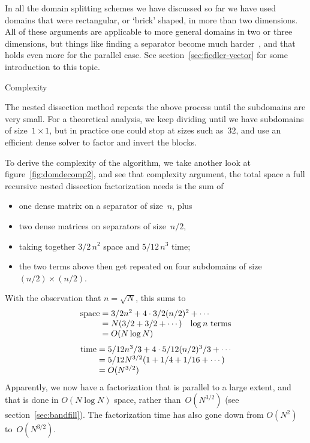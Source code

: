In all the domain splitting schemes we have discussed so far we have
used domains that were rectangular, or `brick' shaped, in more than
two dimensions. All of these arguments are applicable to more general
domains in two or three dimensions, but things like finding a
separator become much harder~\cite{LiRoTa:dissection}, and that holds
even more for the parallel case. See section~\ref{sec:fiedler-vector}
for some introduction to this topic.

 {Complexity}

The nested dissection method repeats the above process until the
subdomains are very small.  For a theoretical analysis, we keep
dividing until we have subdomains of size~$1\times1$, but in practice
one could stop at sizes such as~$32$, and use an efficient dense
solver to factor and invert the blocks.

To derive the complexity of the algorithm, we take another look at
figure~\ref{fig:domdecomp2}, and see that
complexity argument, the total space a full recursive nested
dissection factorization needs is the sum of
\begin{itemize}
\item one dense matrix on a separator of size~$n$, plus
\item two dense matrices on separators of size~$n/2$,
\item taking together $3/2\,n^2$ space and $5/12\,n^3$ time;
\item the two terms above then get repeated on four subdomains of
  size $(n/2)\times(n/2)$.
\end{itemize}
With the observation that $n=\sqrt N$, this sums to
\[ 
\begin{array}{r@{{}={}}l}
\mathrm{space}&3/2n^2+4\cdot 3/2(n/2)^2+\cdots\\
   & N(3/2+3/2+\cdots)\quad\hbox{$\log n$ terms}\\
   & O(N\log N)
\end{array}
\]
\[ 
\begin{array}{r@{{}={}}l}
\mathrm{time}&5/12n^3/3+4\cdot 5/12(n/2)^3/3+\cdots\\
   & 5/12 N^{3/2}(1+1/4+1/16+\cdots)\\
   & O(N^{3/2})
\end{array}
\]
Apparently, we now have a factorization that is parallel to a large
extent, and that is done in $O(N\log N)$ space, rather than~$O(N^{3/2})$
(see section~\ref{sec:bandfill}). The factorization time has also gone
down from $O(N^2)$ to~$O(N^{3/2})$.

